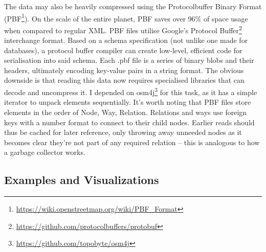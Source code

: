 The data may also be heavily compressed using the Protocolbuffer Binary Format (PBF\footnote{\url{https://wiki.openstreetmap.org/wiki/PBF_Format}}). On the scale of the entire planet, PBF saves over 96\% of space usage when compared to regular XML. PBF files utilise Google's Protocol Buffer\footnote{\url{https://github.com/protocolbuffers/protobuf}} interchange format. Based on a schema specification (not unlike one made for databases), a protocol buffer compiler can create low-level, efficient code for serialisation into said schema. Each .pbf file is a series of binary blobs and their headers, ultimately encoding key-value pairs in a string format. The obvious downside is that reading this data now requires specialised libraries that can decode and uncompress it. I depended on osm4j\footnote{\url{https://github.com/topobyte/osm4j}} for this task, as it has a simple iterator to unpack elements sequentially.
It's worth noting that PBF files store elements in the order of Node, Way, Relation. Relations and ways use foreign keys with a number format to connect to their child nodes. Earlier reads should thus be cached for later reference, only throwing away unneeded nodes as it becomes clear they're not part of any required relation -- this is analogous to how a garbage collector works.


\subsection{Examples and Visualizations}
